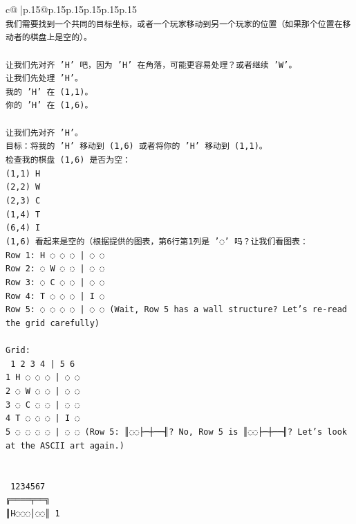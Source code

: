 \documentclass{article}
\begin{document}
{\begin{supertabular}{c@{$\;$}|p{.15\linewidth}@{}p{.15\linewidth}p{.15\linewidth}p{.15\linewidth}p{.15\linewidth}p{.15\linewidth}}
{{{\\ 
\texttt{我们需要找到一个共同的目标坐标，或者一个玩家移动到另一个玩家的位置（如果那个位置在移动者的棋盘上是空的）。} \\
\\ 
\texttt{让我们先对齐 'H' 吧，因为 'H' 在角落，可能更容易处理？或者继续 'W'。} \\
\texttt{让我们先处理 'H'。} \\
\texttt{我的 'H' 在 (1,1)。} \\
\texttt{你的 'H' 在 (1,6)。} \\
\\ 
\texttt{让我们先对齐 'H'。} \\
\texttt{目标：将我的 'H' 移动到 (1,6) 或者将你的 'H' 移动到 (1,1)。} \\
\texttt{检查我的棋盘 (1,6) 是否为空：} \\
\texttt{(1,1) H} \\
\texttt{(2,2) W} \\
\texttt{(2,3) C} \\
\texttt{(1,4) T} \\
\texttt{(6,4) I} \\
\texttt{(1,6) 看起来是空的（根据提供的图表，第6行第1列是 '◌' 吗？让我们看图表：} \\
\texttt{Row 1: H ◌ ◌ ◌ | ◌ ◌} \\
\texttt{Row 2: ◌ W ◌ ◌ | ◌ ◌} \\
\texttt{Row 3: ◌ C ◌ ◌ | ◌ ◌} \\
\texttt{Row 4: T ◌ ◌ ◌ | I ◌} \\
\texttt{Row 5: ◌ ◌ ◌ ◌ | ◌ ◌ (Wait, Row 5 has a wall structure? Let's re{-}read the grid carefully)} \\
\\ 
\texttt{Grid:} \\
\texttt{  1 2 3 4 | 5 6} \\
\texttt{1 H ◌ ◌ ◌ | ◌ ◌} \\
\texttt{2 ◌ W ◌ ◌ | ◌ ◌} \\
\texttt{3 ◌ C ◌ ◌ | ◌ ◌} \\
\texttt{4 T ◌ ◌ ◌ | I ◌} \\
\texttt{5 ◌ ◌ ◌ ◌ | ◌ ◌  (Row 5: ║◌◌├─┼──╢? No, Row 5 is ║◌◌├─┼──╢? Let's look at the ASCII art again.)} \\
\\ 
\\ 
\texttt{ 1234567} \\
\texttt{╔════╤══╗} \\
\texttt{║H◌◌◌│◌◌║ 1} \\
}}}
\end{supertabular}}
\end{document}
